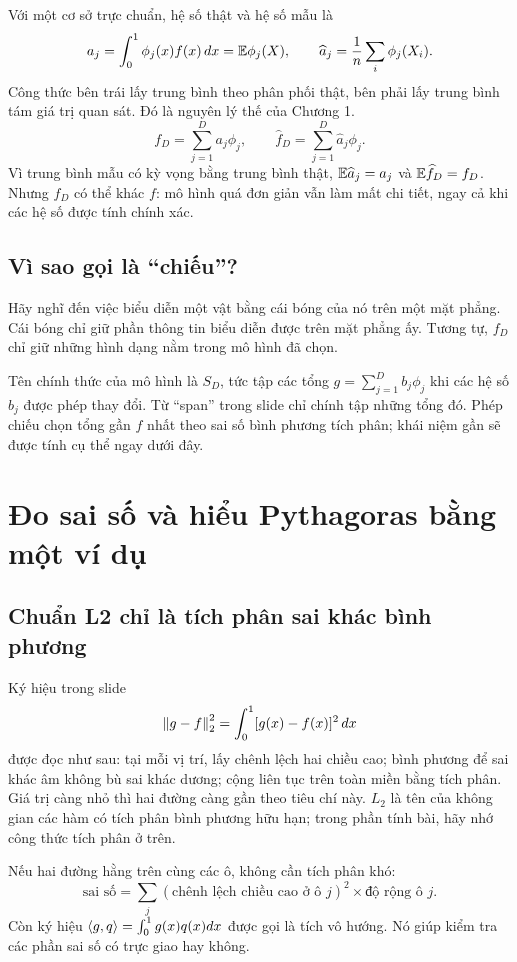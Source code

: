 Với một cơ sở trực chuẩn, hệ số thật và hệ số mẫu là
\[
a_j=\int_0^1\phi_j(x)f(x)\,dx=\mathbb E\phi_j(X),\qquad
\widehat a_j=\frac1n\sum_i\phi_j(X_i).
\]
Công thức bên trái lấy trung bình theo phân phối thật, bên phải lấy
trung bình tám giá trị quan sát. Đó là nguyên lý thế của Chương 1.
\[
\boxed{f_D=\sum_{j=1}^D a_j\phi_j,\qquad
\widehat f_D=\sum_{j=1}^D\widehat a_j\phi_j.}
\]
Vì trung bình mẫu có kỳ vọng bằng trung bình thật,
$\mathbb E\widehat a_j=a_j$ và $\mathbb E\widehat f_D=f_D$.
Nhưng $f_D$ có thể khác $f$: mô hình quá đơn giản vẫn làm mất chi tiết,
ngay cả khi các hệ số được tính chính xác.

\subsection{Vì sao gọi là ``chiếu''?}
Hãy nghĩ đến việc biểu diễn một vật bằng cái bóng của nó trên một mặt
phẳng. Cái bóng chỉ giữ phần thông tin biểu diễn được trên mặt phẳng ấy.
Tương tự, $f_D$ chỉ giữ những hình dạng nằm trong mô hình đã chọn.

Tên chính thức của mô hình là $S_D$, tức tập các tổng
$g=\sum_{j=1}^Db_j\phi_j$ khi các hệ số $b_j$ được phép thay đổi.
Từ ``span'' trong slide chỉ chính tập những tổng đó.
Phép chiếu chọn tổng gần $f$ nhất theo sai số bình phương tích phân;
khái niệm gần sẽ được tính cụ thể ngay dưới đây.

\section{Đo sai số và hiểu Pythagoras bằng một ví dụ}
\subsection{Chuẩn L2 chỉ là tích phân sai khác bình phương}
Ký hiệu trong slide
\[
\left\lVert g-f\right\rVert_2^2=\int_0^1[g(x)-f(x)]^2\,dx
\]
được đọc như sau: tại mỗi vị trí, lấy chênh lệch hai chiều cao; bình phương
để sai khác âm không bù sai khác dương; cộng liên tục trên toàn miền
bằng tích phân. Giá trị càng nhỏ thì hai đường càng gần theo tiêu chí này.
$L_2$ là tên của không gian các hàm có tích phân bình phương hữu hạn;
trong phần tính bài, hãy nhớ công thức tích phân ở trên.

Nếu hai đường hằng trên cùng các ô, không cần tích phân khó:
\[
\text{sai số}=\sum_j(\text{chênh lệch chiều cao ở ô }j)^2
 \times\text{độ rộng ô }j.
\]
Còn ký hiệu $\left\langle g,q\right\rangle=\int_0^1g(x)q(x)dx$ được gọi là tích vô hướng.
Nó giúp kiểm tra các phần sai số có trực giao hay không.

